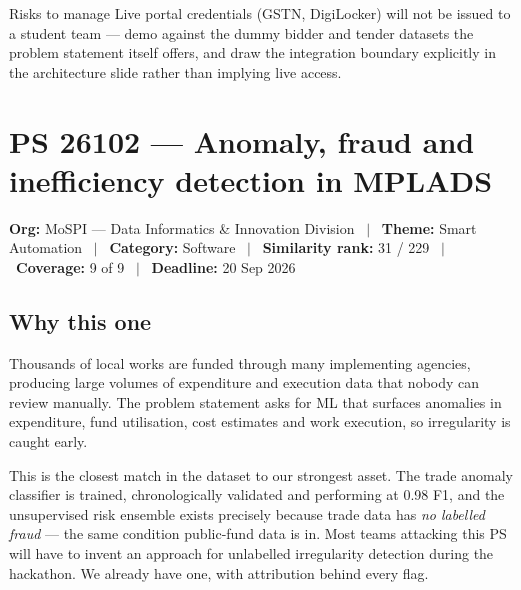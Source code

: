 \documentclass[11pt]{article}
\newcommand{\psbanner}[6]{%
  \vspace{0.2em}
  {\footnotesize\color{gxslate}\textbf{Org:} #1 \ $\vert$ \ \textbf{Theme:} #2 \ $\vert$ \ \textbf{Category:} #3 \ $\vert$ \ \textbf{Similarity rank:} #4 \ $\vert$ \ \textbf{Coverage:} #5 \ $\vert$ \ \textbf{Deadline:} #6}
  \par\vspace{0.6em}
}
\begin{document}
\begin{warnbox}{Risks to manage}
Live portal credentials (GSTN, DigiLocker) will not be issued to a student team --- demo against the dummy
bidder and tender datasets the problem statement itself offers, and draw the integration boundary
explicitly in the architecture slide rather than implying live access.
\end{warnbox}

\clearpage
\section{PS 26102 --- Anomaly, fraud and inefficiency detection in MPLADS}
\psbanner{MoSPI --- Data Informatics \& Innovation Division}{Smart Automation}{Software}{31 / 229}{9 of 9}{20 Sep 2026}

\subsection*{Why this one}
Thousands of local works are funded through many implementing agencies, producing large volumes of
expenditure and execution data that nobody can review manually. The problem statement asks for ML that
surfaces anomalies in expenditure, fund utilisation, cost estimates and work execution, so irregularity is
caught early.

This is the closest match in the dataset to our strongest asset. The trade anomaly classifier is trained,
chronologically validated and performing at 0.98 F1, and the unsupervised risk ensemble exists precisely
because trade data has \emph{no labelled fraud} --- the same condition public-fund data is in. Most teams
attacking this PS will have to invent an approach for unlabelled irregularity detection during the
hackathon. We already have one, with attribution behind every flag.
\end{document}
